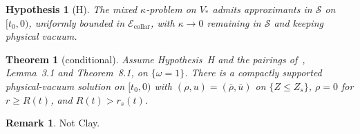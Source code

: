 \documentclass{amsart}
\theoremstyle{plain}
\newtheorem{theorem}{Theorem}
\newtheorem{hypothesis}{Hypothesis}
\theoremstyle{definition}
\newtheorem{remark}{Remark}
\begin{document}
\begin{hypothesis}[H]
The mixed $\kappa$-problem on $V_*$ admits approximants in $\mathcal{S}$
on $[t_0,0)$, uniformly bounded in $\mathcal{E}_{\mathrm{collar}}$,
with $\kappa\to0$ remaining in $\mathcal{S}$ and keeping physical vacuum.
\end{hypothesis}

\begin{theorem}[conditional]
Assume Hypothesis~H and the pairings of~\cite{CS2011}, Lemma~3.1 and
Theorem~8.1, on $\{\omega=1\}$. There is a compactly supported
physical-vacuum solution on $[t_0,0)$ with
$(\rho,u)=(\bar\rho,\bar u)$ on $\{Z\le Z_s\}$,
$\rho=0$ for $r\ge R(t)$, and $R(t)>r_s(t)$.
\end{theorem}

\begin{remark}
Not Clay.
\end{remark}



\end{document}
